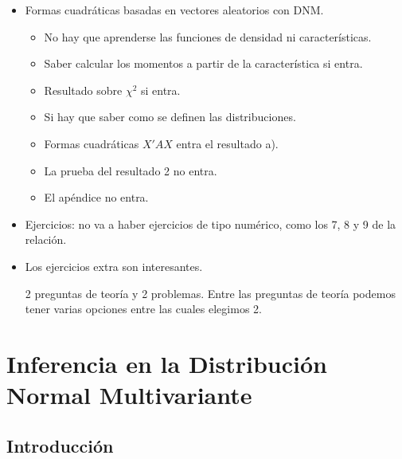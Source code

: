 \documentclass[11pt,a4paper]{article}
\begin{document}
\begin{itemize}
\item Formas cuadráticas basadas en vectores aleatorios con DNM.
\begin{itemize}
\item No hay que aprenderse las funciones de densidad ni características.
\item Saber calcular los momentos a partir de la característica si entra.
\item Resultado sobre $\chi^{2}$ si entra.
\item Si hay que saber como se definen las distribuciones.
\item Formas cuadráticas $X'AX$ entra el resultado a).
\item La prueba del resultado 2 no entra.
\item El apéndice no entra.
\end{itemize}

\item Ejercicios: no va a haber ejercicios de tipo numérico, como los 7, 8 y 9 de la relación.\item Los ejercicios extra son interesantes.

2 preguntas de teoría y 2 problemas. Entre las preguntas de teoría podemos tener varias opciones entre las cuales elegimos 2.
\end{itemize}

\newpage

\section{Inferencia en la Distribución Normal Multivariante}
\subsection{Introducción}
\end{document}
